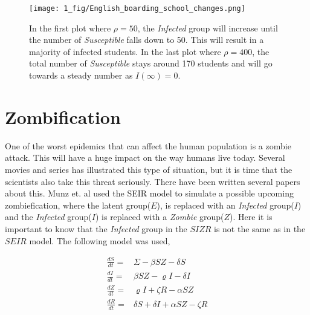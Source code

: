 \documentclass[%
twoside,                 %
final,                   %
chapterprefix=true,      %
open=right               %
10pt]{book}
\begin{document}
\begin{figure}[ht]
  \centerline{\texttt{[image: 1\_fig/English\_boarding\_school\_changes.png]}}
  \caption{
  \label{fig:rho_changes} In the first plot where $\rho=50$, the \emph{Infected} group will increase until the number of \emph{Susceptible} falls down to 50. This will result in a majority of infected students. In the last plot where $\rho=400$, the total number of \emph{Susceptible} stays around 170 students and will go towards a steady number as $I(\infty)=0$.
  }
\end{figure}


\section{Zombification}
One of the worst epidemics that can affect the human population is a zombie attack. This will have a huge impact on the way humans live today. Several movies and series has illustrated this type of situation, but it is time that the scientists also take this threat seriously. There have been written several papers about this. Munz et. al\cite{munz2009zombies} used the SEIR model to simulate a possible upcoming zombiefication, where the latent group($E$), is replaced with an \emph{Infected} group($I$) and the \emph{Infected} group($I$) is replaced with a \emph{Zombie} group($Z$). Here it is important to know that the \emph{Infected} group in the $SIZR$ is not the same as in the $SEIR$ model. The following model was used,

\begin{align*}
\frac{dS}{dt} =& \Sigma -\beta SZ - \delta S \\
\frac{dI}{dt} =& \beta SZ - \varrho I - \delta I\\
\frac{dZ}{dt} =& \varrho I + \zeta R - \alpha SZ\\
\frac{dR}{dt} =& \delta S + \delta I + \alpha SZ - \zeta R
\end{align*}
\end{document}
